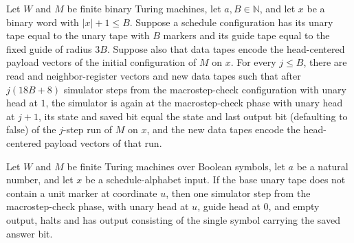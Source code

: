 \begin{lemma}
\label{Complexity.dataCfg_iterates}
\leanok
{}
Let $W$ and $M$ be finite binary Turing machines, let $a,B\in\mathbb{N}$, and let $x$ be
a binary word with $|x|+1\le B$. Suppose a schedule configuration has its unary tape
equal to the unary tape with $B$ markers and its guide tape equal to the fixed guide of
radius $3B$. Suppose also that data tapes encode the head-centered payload vectors of
the initial configuration of $M$ on $x$. For every $j\le B$, there are read and
neighbor-register vectors and new data tapes such that after $j(18B+8)$ simulator steps
from the macrostep-check configuration with unary head at $1$, the simulator is again at
the macrostep-check phase with unary head at $j+1$, its state and saved bit equal the
state and last output bit (defaulting to false) of the $j$-step run of $M$ on $x$, and
the new data tapes encode the head-centered payload vectors of that run.
\end{lemma}

\begin{lemma}
\label{Complexity.dataCfg_finish}
\leanok
{}
Let $W$ and $M$ be finite Turing machines over Boolean symbols, let $a$ be a natural
number, and let $x$ be a schedule-alphabet input. If the base unary tape does not
contain a unit marker at coordinate $u$, then one simulator step from the
macrostep-check phase, with unary head at $u$, guide head at $0$, and empty output,
halts and has output consisting of the single symbol carrying the saved answer bit.
\end{lemma}

